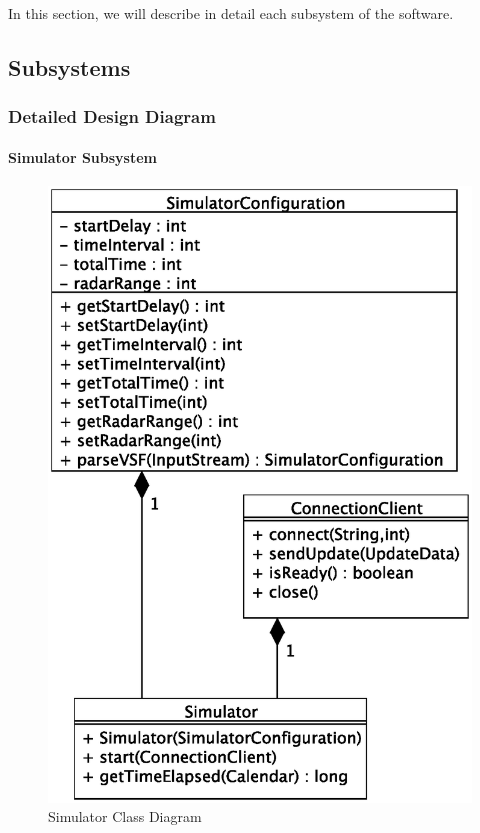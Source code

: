 \documentclass{article}
\begin{document}
In this section, we will describe in detail each subsystem of the software.

\subsection{Subsystems} %

\subsubsection{Detailed Design Diagram} %

\paragraph{Simulator Subsystem} 

\begin{figure}[!htb]
\caption{Simulator Class Diagram}
\centering
\includegraphics[scale=0.6]{diagrams/simulator-class-diagram.eps}
\end{figure}
\end{document}
